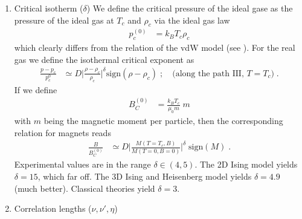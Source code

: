 \begin{enumerate}
\item Critical isotherm ($\delta$)
We define the critical pressure of the ideal gase as the pressure of the ideal gas at $T_{c}$ and 
$\rho_{c}$ via the ideal gas law
%
\begin{align*}
p_{c}^{(0)}&= k_{B}T_{c} \rho_{c}
\end{align*}
%
which clearly differs from the relation of the vdW model (see ).
For the real gas we define the isothermal critical exponent as
%
\begin{align}
\frac{p-p_{c}}{p_{c}^{0}} & \simeq D \bigg| \frac{\rho-\rho_{c}}{\rho_{c}}\bigg|^{\delta} \text{sign} (\rho-\rho_{c})\;;\quad \big(\text{along the path III, } T=T_{c}  \big)\;.
\end{align}
%
If we define 
%
\begin{align*}
B_{C}^{(0)} &= \frac{k_{B} T_{c}}{\mu_{0} m}\;m
\end{align*}
%
with $m$ being the magnetic moment  per particle, then the corresponding relation for magnets reads
%
\begin{align*}
\frac{B}{B_{C}^{(0)}} &\simeq D \bigg|
\frac{M(T=T_{c},B)}{M(T=0,B=0)}
\bigg|^{\delta} \;\text{sign} (M)\;.
\end{align*}
%
Experimental values are in the range $\delta\in (4,5)$. The 2D Ising model yields $\delta=15$, which 
far off. The 3D Ising and Heisenberg model yields $\delta=4.9$ (much better). Classical theories 
yield $\delta=3$.

\item Correlation lengths ($\nu,\nu',\eta$)



\end{enumerate}
